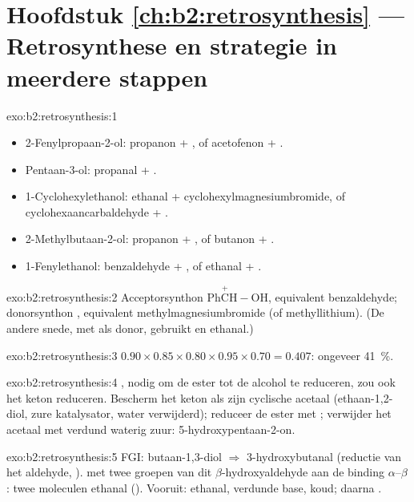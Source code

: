 \section*{Hoofdstuk \ref{ch:b2:retrosynthesis} --- Retrosynthese en strategie in meerdere stappen}

\begin{solution}{exo:b2:retrosynthesis:1}
\begin{itemize}
  \item 2-Fenylpropaan-2-ol: propanon + , of acetofenon + .
  \item Pentaan-3-ol: propanal + .
  \item 1-Cyclohexylethanol: ethanal + cyclohexylmagnesiumbromide, of cyclohexaancarbaldehyde +
        .
  \item 2-Methylbutaan-2-ol: propanon + , of butanon + .
  \item 1-Fenylethanol: benzaldehyde + , of ethanal + .
\end{itemize}
\end{solution}

\begin{solution}{exo:b2:retrosynthesis:2}
Acceptorsynthon $\mathrm{Ph\overset{+}{C}H{-}OH}$, equivalent benzaldehyde; donorsynthon ,
equivalent methylmagnesiumbromide (of methyllithium). (De andere snede, met  als donor, gebruikt
 en ethanal.)
\end{solution}

\begin{solution}{exo:b2:retrosynthesis:3}
$0.90 \times 0.85 \times 0.80 \times 0.95 \times 0.70 = 0.407$: ongeveer 41~\%.
\end{solution}

\begin{solution}{exo:b2:retrosynthesis:4}
, nodig om de ester tot de alcohol te reduceren, zou ook het keton reduceren. Bescherm het
keton als zijn cyclische acetaal (ethaan-1,2-diol, zure katalysator, water verwijderd); reduceer de ester met
; verwijder het acetaal met verdund waterig zuur: 5-hydroxypentaan-2-on.
\end{solution}

\begin{solution}{exo:b2:retrosynthesis:5}
FGI: butaan-1,3-diol $\Rightarrow$ 3-hydroxybutanal (reductie van het aldehyde, ).  met twee
groepen van dit $\beta$-hydroxyaldehyde aan de binding $\alpha$--$\beta$: twee moleculen ethanal
(). Vooruit: ethanal, verdunde base, koud; daarna .
\end{solution}

